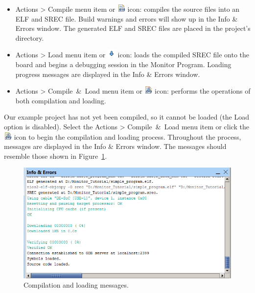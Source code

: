 \documentclass[11pt, twoside, pdftex]{article}
\begin{document}
\begin{itemize}
\item \textsf{Actions > Compile} menu item or \includegraphics{toolbar/compile.png} 
icon: compiles the source files into an ELF and SREC file. Build
warnings and errors will show up in the 
\textsf{Info \& Errors} window.
The generated ELF and SREC files are placed in the project's directory.

\item \textsf{Actions > Load} menu item or \includegraphics{toolbar/load.png} icon:
loads the compiled SREC file onto the board and begins a
debugging session in the Monitor Program. Loading progress
messages are displayed in the \textsf{Info \& Errors} window.

\item \textsf{Actions > Compile~\&~Load} menu item or \includegraphics{toolbar/compile_load.png}
icon: performs the operations of both compilation and loading.
\end{itemize}

Our example project has not yet been compiled, so it cannot be
loaded (the \textsf{Load} option is disabled).  
Select the \textsf{Actions > Compile~\&~Load} menu item
or click the \includegraphics{toolbar/compile_load.png} icon to
begin the compilation and loading process.  
Throughout the process, messages are displayed in 
the \textsf{Info \& Errors} window. The messages should resemble
those shown in Figure~\ref{fig:12}.

\begin{figure}[H]
   \begin{center}
      \includegraphics[scale=.8]{screenshots/figure12.png}
   \end{center}
   \caption{Compilation and loading messages.} 
	 \label{fig:12}
\end{figure}
\end{document}
